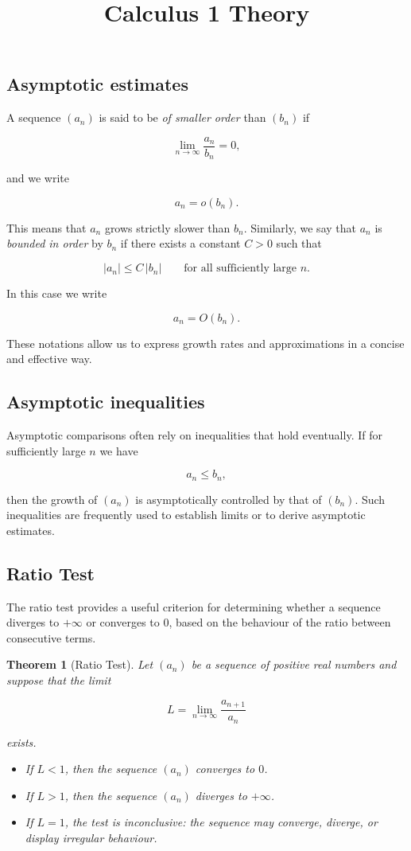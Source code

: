 \documentclass[11pt,a4paper]{article} \usepackage[T1]{fontenc}
\theoremstyle{plain} \newtheorem{theorem}{Theorem} \title{Calculus 1 Theory}
\begin{document}
\subsection*{Asymptotic estimates}

A sequence $(a_n)$ is said to be \emph{of smaller order} than $(b_n)$ if

\[
\lim_{n\to\infty} \frac{a_n}{b_n} = 0,
\]

and we write

\[
a_n = o(b_n).
\]

This means that $a_n$ grows strictly slower than $b_n$. Similarly, we say that
$a_n$ is \emph{bounded in order} by $b_n$ if there exists a constant $C>0$ such
that

\[
|a_n| \le C\,|b_n| \qquad \text{for all sufficiently large } n.
\]

In this case we write

\[
a_n = O(b_n).
\]

These notations allow us to express growth rates and approximations in a
concise and effective way.

\subsection*{Asymptotic inequalities}

Asymptotic comparisons often rely on inequalities that hold eventually. If for
sufficiently large $n$ we have

\[
a_n \le b_n,
\]

then the growth of $(a_n)$ is asymptotically controlled by that of $(b_n)$.
Such inequalities are frequently used to establish limits or to derive
asymptotic estimates.

\subsection{Ratio Test}

The ratio test provides a useful criterion for determining whether a sequence
diverges to $+\infty$ or converges to $0$, based on the behaviour of the ratio
between consecutive terms.

\begin{theorem}
[Ratio Test] Let $(a_n)$ be a sequence of positive real numbers and suppose
that the limit

\[
L = \lim_{n\to\infty} \frac{a_{n+1}}{a_n}
\]

exists.

\begin{itemize}
\item If $L < 1$, then the sequence $(a_n)$ converges to $0$.
\item If $L > 1$, then the sequence $(a_n)$ diverges to $+\infty$.
\item If $L = 1$, the test is inconclusive: the sequence may converge, diverge,
or display irregular behaviour.
\end{itemize}

\end{theorem}
\end{document}
